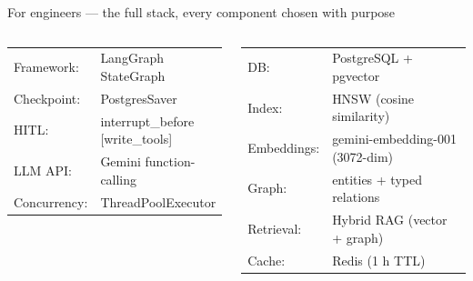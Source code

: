 \documentclass[aspectratio=169, 10pt]{beamer}
\begin{document}
\begin{frame}{For engineers — the full stack, every component chosen with purpose}
  \begin{columns}[T]
      \begin{tcolorbox}[skycard, title={\faCode\; Agent Framework}]
        \scriptsize\ttfamily\setlength\itemsep{1pt}
        \begin{tabular}{@{}ll@{}}
          Framework:   & LangGraph StateGraph \\
          Checkpoint:  & PostgresSaver \\
          HITL:        & interrupt\_before [write\_tools] \\
          LLM API:     & Gemini function-calling \\
          Concurrency: & ThreadPoolExecutor \\
        \end{tabular}
      \end{tcolorbox}
      \vspace{4pt}
      \begin{tcolorbox}[indigocard, title={\faDatabase\; Memory System}]
        \scriptsize\ttfamily
        \begin{tabular}{@{}ll@{}}
          DB:         & PostgreSQL + pgvector \\
          Index:      & HNSW (cosine similarity) \\
          Embeddings: & gemini-embedding-001 (3072-dim) \\
          Graph:      & entities + typed relations \\
          Retrieval:  & Hybrid RAG (vector + graph) \\
          Cache:      & Redis (1 h TTL) \\
        \end{tabular}
      \end{tcolorbox}


\end{columns}
\end{frame}
\end{document}

